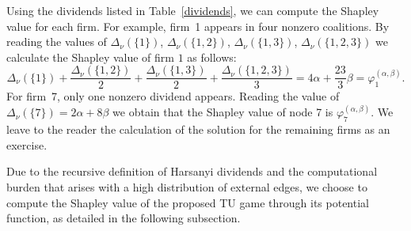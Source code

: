 \documentclass[preprint,11pt,authoryear]{elsarticle}
\theoremstyle{plain}
\begin{document}
\begin{table}[H]
\centering
{}
\caption{\scriptsize Nonzero Harsanyi dividends for the cooperative game associated with Example~\ref{ex:threeU}.}
\label{dividends}
\end{table}
Using the dividends listed in Table~\ref{dividends}, we can compute the Shapley value for each firm. For example, firm~1 appears in four nonzero coalitions.
By reading the values of
$\Delta_\nu(\{1\})$,  $\Delta_\nu(\{1,2\})$,  $\Delta_\nu(\{1,3\})$,  $\Delta_\nu(\{1,2,3\})$
we calculate the Shapley value of firm $1$ as follows:
\[
\Delta_\nu(\{1\}) + \frac{\Delta_\nu(\{1,2\})}{2} + \frac{\Delta_\nu(\{1,3\})}{2} + \frac{\Delta_\nu(\{1,2,3\})}{3} = 4\alpha + \frac{23}{3}\beta = \varphi_1^{(\alpha,\beta)}.
\]
For firm~7, only one nonzero dividend appears. Reading the value of
$\Delta_\nu(\{7\}) = 2\alpha + 8\beta$
we obtain that the Shapley value of node 7 is
$\varphi_7^{(\alpha,\beta)}.$
We leave to the reader the calculation of the solution for the remaining firms as an exercise.


Due to the recursive definition of Harsanyi dividends and the computational burden that arises with a high distribution of external edges, we choose to compute the Shapley value of the proposed TU game through its potential function, as detailed in the following subsection.
\end{document}
